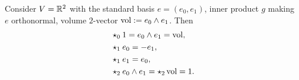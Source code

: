 \begin{example}
  Consider
    $V = \mathbb{R}^2$ with the standard basis $e = (e_0, e_1)$,
    inner product $g$ making $e$ orthonormal,
    volume $2$-vector $\mathop{\rm vol}\nolimits := e_0 \wedge e_1$.
  Then
  \begin{subequations}
    \begin{align}
      & \star_0 1 = e_0 \wedge e_1 = \mathop{\rm vol}\nolimits, \\
      & \star_1 e_0 = - e_1, \\
      & \star_1 e_1 = e_0, \\
      & \star_2 e_0 \wedge e_1 = \star_2 \mathop{\rm vol}\nolimits = 1.
    \end{align}
  \end{subequations}
\end{example}

